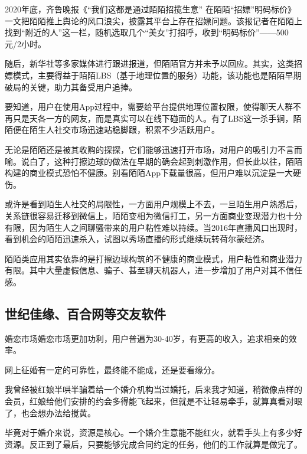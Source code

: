 \documentclass[UTF8]{ctexart}
\begin{document}
\begin{tcolorbox}
    2020年底，齐鲁晚报《“我们这都是通过陌陌招揽生意” 在陌陌“招嫖”明码标价》一文把陌陌推上舆论的风口浪尖，披露其平台上存在招嫖问题。该报记者在陌陌上找到“附近的人”这一栏，随机选取几个“美女”打招呼，收到“明码标价”——500元/2小时。

    随后，新华社等多家媒体进行跟进报道，但陌陌官方并未予以回应。其实，这类招嫖模式，主要得益于陌陌LBS（基于地理位置的服务）功能，该功能也是陌陌早期破局的关键，助力其备受用户追捧。

    要知道，用户在使用App过程中，需要给平台提供地理位置权限，使得聊天人群不再只是天各一方的网友，而是真实可以在线下碰面的人。有了LBS这一杀手锏，陌陌便在陌生人社交市场迅速站稳脚跟，积累不少活跃用户。

    无论是陌陌还是被其收购的探探，它们能够迅速打开市场，对用户的吸引力不言而喻。说白了，这种打擦边球的做法在早期的确会起到刺激作用，但长此以往，陌陌构建的商业模式恐怕不健康。别看陌陌App下载量很高，但用户难以沉淀是一大硬伤。

    或许是看到陌生人社交的局限性，一方面用户规模上不去，一旦陌生用户熟悉后，关系链很容易迁移到微信上，陌陌变相为微信打工，另一方面商业变现潜力也十分有限，因为陌生人之间聊骚带来的用户粘性难以持续。当2016年直播风口出现时，看到机会的陌陌迅速杀入，试图以秀场直播的形式继续玩转荷尔蒙经济。\cite{MoMoWhy}
\end{tcolorbox}

陌陌类应用其实依靠的是打擦边球构筑的不健康的商业模式，用户粘性和商业潜力有限。其中大量虚假信息、骗子、甚至聊天机器人，进一步增加了用户对其不信任感。

\subsection{世纪佳缘、百合网等交友软件}

婚恋市场婚恋市场更加功利，用户普遍为30-40岁，有更高的收入，追求相亲的效率。

\begin{tcolorbox}
    网上征婚有一定的可靠性，最终能不能成，还是要看缘分。

    我曾经被红娘半哄半骗着给一个婚介机构当过婚托，后来我才知道，稍微像点样的会员，红娘给他们安排的约会多得能飞起来，但就是不让轻易牵手，就算真看对眼了，也会想办法给搅黄。

    毕竟对于婚介来说，资源是核心。一个婚介生意能不能红火，就看手头上有多少好资源。反正到了最后，只要能够完成合同约定的任务，他们的工作就算是做完了。\cite{CheatTheLiving}
\end{tcolorbox}
\end{document}
